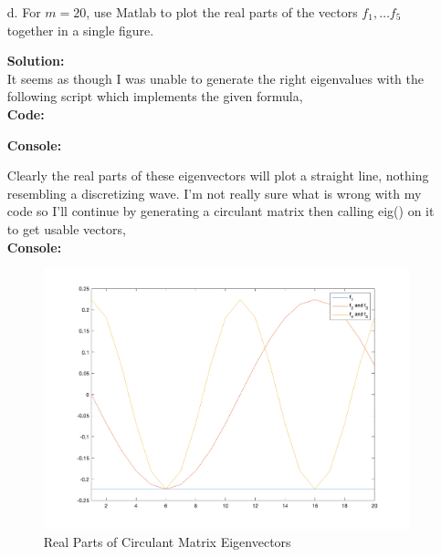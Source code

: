 \documentclass[12pt]{article}
\makeatletter
\theoremstyle{homework}
\newenvironment{exercise}[1]
{\def\@currentlabel{#1}\exercisecore}
{\endexercisecore}
\newcommand{\localhead}[1]{\par\smallskip\noindent\textbf{#1}\nobreak\\}%
\newcommand\solution{\localhead{Solution:}}
\makeatother
\begin{document}
\begin{exercise}{P23}
\begin{enumerate}
    \item[d.] For $m = 20$, use Matlab to plot the real parts of the vectors $f_1, \dots f_5$ together in a single figure.\\
    \solution It seems as though I was unable to generate the right eigenvalues with the following script which implements the given formula, \\
     \textbf{Code:}
     \begin{center}
     
     \end{center} 
     \textbf{Console:}
     \begin{center}
     
     \end{center} 
     Clearly the real parts of these eigenvectors will plot a straight line, nothing resembling a discretizing wave. I'm not really sure what is wrong with my code so I'll continue 
     by generating a circulant matrix 
     then calling eig() on it to get usable vectors,\\
     \textbf{Console:}
     \begin{center}
     
     \end{center}   
      \begin{figure}[H] 
        \begin{center}  
        \caption{Real Parts of Circulant Matrix Eigenvectors}  
        \includegraphics[width = \textwidth]{P23d.png}  
        \end{center}  
      \end{figure}
    \vspace{1in}
      



\end{enumerate}
\end{exercise}
\end{document}
